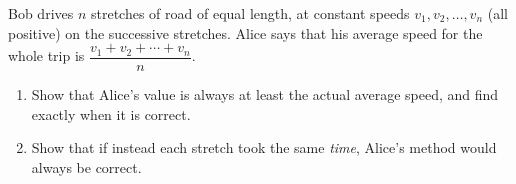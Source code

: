 Bob drives $n$ stretches of road of equal length, at constant speeds $v_1,v_2,\dots,v_n$ (all positive) on the successive stretches. Alice says that his average speed for the whole trip is $\dfrac{v_1+v_2+\cdots+v_n}{n}$.
\begin{enumerate}
\item[(a)] Show that Alice's value is always at least the actual average speed, and find exactly when it is correct.
\item[(b)] Show that if instead each stretch took the same \emph{time}, Alice's method would always be correct.
\end{enumerate}
